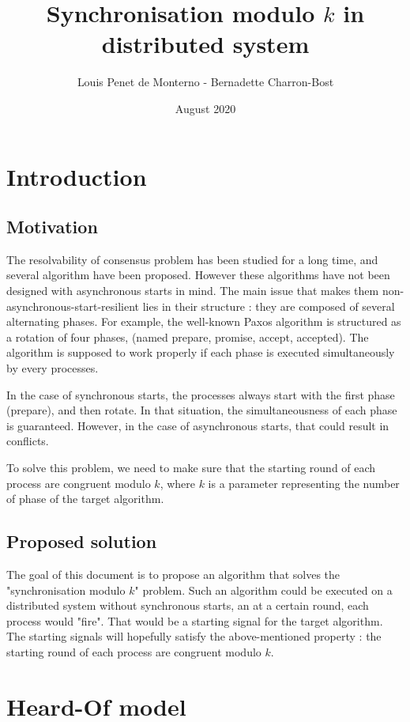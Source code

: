 \documentclass{article}
\title{Synchronisation modulo $k$ in distributed system}
\date{August 2020}
\author{Louis Penet de Monterno - Bernadette Charron-Bost}
\begin{document}
\maketitle

\section{Introduction}

\subsection{Motivation}

The resolvability of consensus problem has been studied for a long time, and several algorithm have been 
proposed. However these algorithms have not been designed with asynchronous starts in mind.
The main issue that makes them non-asynchronous-start-resilient lies in their structure :
they are composed of several alternating phases.
For example, the well-known Paxos algorithm is structured as a rotation of four phases, (named prepare,
promise, accept, accepted).
The algorithm is supposed to work properly if each phase is executed simultaneously by every processes.

In the case of synchronous starts, the processes always start with the first phase (prepare), and then rotate.
In that situation, the simultaneousness of each phase is guaranteed.
However, in the case of asynchronous starts, that could result in conflicts.

To solve this problem, we need to make sure that the starting round of each process are congruent modulo $k$,
where $k$ is a parameter representing the number of phase of the target algorithm.

\subsection{Proposed solution}

The goal of this document is to propose an algorithm that solves the "synchronisation modulo $k$" problem.
Such an algorithm could be executed on a distributed system without synchronous starts,
an at a certain round, each process would "fire".
That would be a starting signal for the target algorithm.
The starting signals will hopefully satisfy the above-mentioned property :
the starting round of each process are congruent modulo $k$.


\section{Heard-Of model}
\end{document}
